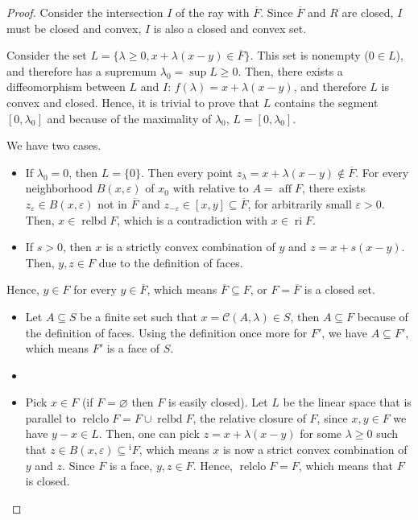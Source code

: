 \begin{proof}
  Consider the intersection \( I \) of the ray with \( \overline{F} \). Since \(
  \overline{F}\) and \( R \) are closed, \( I \) must be closed and convex, \( I
  \) is also a closed and convex set.

  Consider the set \( L = \{ \lambda \ge 0, x + \lambda(x - y) \in
  \overline{F}\}   \). This set is nonempty (\( 0 \in L \)), and therefore has
  a supremum \( \lambda_{0} = \sup L \ge 0 \). Then, there exists a
  diffeomorphism between \( L \) and \( I \): \( f(\lambda) = x + \lambda(x - y)
  \), and therefore \( L \) is convex and closed. Hence, it is trivial to prove
  that \( L \) contains the segment \( [0, \lambda_{0}] \) and because of the
  maximality of \( \lambda_{0} \), \( L = [0, \lambda_{0}] \).

  We have two cases.
  \begin{itemize}
  \item If \( \lambda_{0} = 0 \), then \( L = \{0\}   \). Then every point \(
    z_{\lambda}
    = x + \lambda(x - y) \notin \overline{F}\). For every neighborhood \( B(x,
    \varepsilon) \)
    of \( x_{0} \) with relative to \( A = \operatorname{aff} F \), there exists
    \( z_{\varepsilon} \in B(x, \varepsilon) \) not in \( \overline{F} \) and \(
    z_{-\varepsilon} \in [x, y] \subseteq \overline{F} \), for arbitrarily small
    \( \varepsilon > 0 \). Then, \( x \in \operatorname{relbd} F \), which is a
    contradiction with \( x \in \operatorname{ri} F \).
  \item If \( s > 0 \), then \( x \) is a strictly convex combination of \( y \)
    and \( z = x + s(x - y) \). Then, \( y, z \in F \) due to the definition of
    faces.
  \end{itemize}

  Hence, \( y \in F \) for every \( y \in \overline{F} \), which means \(
  \overline{F} \subseteq F \), or \( F = \overline{F} \) is a closed set.

  \iffalse
  \begin{itemize}
    \item Let \( A \subseteq S \) be a finite set such that \( x =
      \mathcal{C}(A, \lambda) \in S \), then \( A \subseteq F \) because of the
      definition of faces. Using the definition once more for \( F' \), we have
      \( A \subseteq F' \), which means \( F' \) is a face of \( S \).


    \item 
    \item Pick \( x \in F \) (if \( F = \varnothing \) then \( F \) is easily
      closed). Let \( L \) be the linear space that is parallel to \(
      \operatorname{relclo} F = F \cup \operatorname{relbd} F \), the relative
      closure of \( F \), since \( x, y \in F \) we have \( y - x \in L \).
      Then, one can pick \( z = x + \lambda(x - y) \) for some \( \lambda \ge 0
      \) such that \( z \in B(x, \varepsilon) \subseteq \operatorname{^{i} } F
      \), which means \( x \) is now a strict convex combination of \( y \) and
      \( z \). Since \( F \) is a face, \( y, z \in F \). Hence, \(
      \operatorname{relclo} F = F \), which means that \( F \) is closed.


\end{itemize}
\end{proof}
